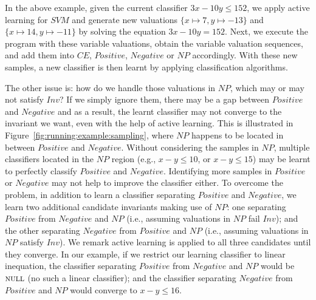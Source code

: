 \begin{example}
In the above example, given the current classifier $\mathit{3x-10y \leq 152}$, we apply active learning for $\mathit{SVM}$ 
and generate new valuations $\mathit{\{x \mapsto 7, y \mapsto -13\}}$ and $\mathit{\{x \mapsto 14, y \mapsto -11\}}$ %
by solving the equation $\mathit{3x-10y = 152}$. %
Next, we execute the program with these variable valuations, obtain the variable valuation sequences, and add them into $\mathit{CE}$, $\mathit{Positive}$, $\mathit{Negative}$ or $\mathit{NP}$ accordingly. 
With these new samples, a new classifier is then learnt by applying classification algorithms.
\end{example}
The other issue is: how do we handle those valuations in $\mathit{NP}$, which may or may not satisfy $\mathit{Inv}$? 
If we simply ignore them, there may be a gap between $\mathit{Positive}$ and $\mathit{Negative}$ 
and as a result, the learnt classifier may not converge to the invariant we want, even with the help of active learning. 
This is illustrated in Figure~\ref{fig:running:example:sampling}, where $\mathit{NP}$ happens to be located in between $\mathit{Positive}$ and $\mathit{Negative}$. 
Without considering the samples in $\mathit{NP}$, multiple classifiers located in the $\mathit{NP}$ region (e.g., $\mathit{x - y \leq 10}$, or $\mathit{x - y \leq 15}$) may be learnt to perfectly classify $\mathit{Positive}$ and $\mathit{Negative}$. 
Identifying more samples in $\mathit{Positive}$ or $\mathit{Negative}$ may not help to improve the classifier either. 
To overcome the problem, in addition to learn a classifier separating $\mathit{Positive}$ and $\mathit{Negative}$, we learn two additional candidate invariants making use of $\mathit{NP}$: 
one separating $\mathit{Positive}$ from $\mathit{Negative}$ and $\mathit{NP}$ (i.e., assuming valuations in $\mathit{NP}$ fail $\mathit{Inv}$); 
and the other separating $\mathit{Negative}$ from $\mathit{Positive}$ and $\mathit{NP}$ (i.e., assuming valuations in $\mathit{NP}$ satisfy $\mathit{Inv}$). 
We remark active learning is applied to all three candidates until they converge. 
In our example, if we restrict our learning classifier to linear inequation, 
the classifier separating $\mathit{Positive}$ from $\mathit{Negative}$ and $\mathit{NP}$ would be $\textsc{null}$ (no such a linear classifier); %
and the classifier separating $\mathit{Negative}$ from $\mathit{Positive}$ and $\mathit{NP}$ would converge to $\mathit{x - y \leq 16}$.

